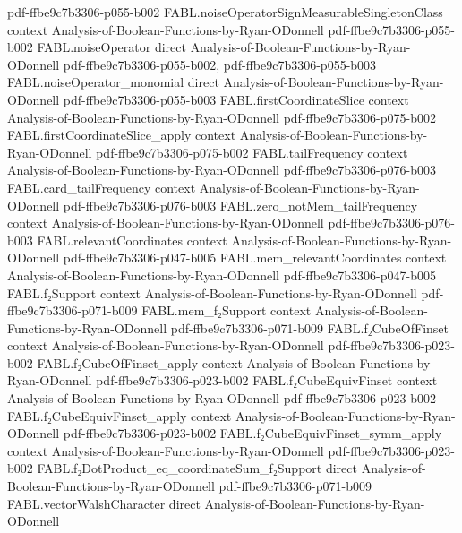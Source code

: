 \begin{theorem}
  {pdf-ffbe9c7b3306-p055-b002}
\proofstep
  {FABL.noiseOperatorSignMeasurableSingletonClass}
  {context}
  {Analysis-of-Boolean-Functions-by-Ryan-ODonnell}
  {pdf-ffbe9c7b3306-p055-b002}
\proofstep
  {FABL.noiseOperator}
  {direct}
  {Analysis-of-Boolean-Functions-by-Ryan-ODonnell}
  {pdf-ffbe9c7b3306-p055-b002,
    pdf-ffbe9c7b3306-p055-b003}
\proofstep
  {FABL.noiseOperator_monomial}
  {direct}
  {Analysis-of-Boolean-Functions-by-Ryan-ODonnell}
  {pdf-ffbe9c7b3306-p055-b003}
\proofstep
  {FABL.firstCoordinateSlice}
  {context}
  {Analysis-of-Boolean-Functions-by-Ryan-ODonnell}
  {pdf-ffbe9c7b3306-p075-b002}
\proofstep
  {FABL.firstCoordinateSlice_apply}
  {context}
  {Analysis-of-Boolean-Functions-by-Ryan-ODonnell}
  {pdf-ffbe9c7b3306-p075-b002}
\proofstep
  {FABL.tailFrequency}
  {context}
  {Analysis-of-Boolean-Functions-by-Ryan-ODonnell}
  {pdf-ffbe9c7b3306-p076-b003}
\proofstep
  {FABL.card_tailFrequency}
  {context}
  {Analysis-of-Boolean-Functions-by-Ryan-ODonnell}
  {pdf-ffbe9c7b3306-p076-b003}
\proofstep
  {FABL.zero_notMem_tailFrequency}
  {context}
  {Analysis-of-Boolean-Functions-by-Ryan-ODonnell}
  {pdf-ffbe9c7b3306-p076-b003}
\proofstep
  {FABL.relevantCoordinates}
  {context}
  {Analysis-of-Boolean-Functions-by-Ryan-ODonnell}
  {pdf-ffbe9c7b3306-p047-b005}
\proofstep
  {FABL.mem_relevantCoordinates}
  {context}
  {Analysis-of-Boolean-Functions-by-Ryan-ODonnell}
  {pdf-ffbe9c7b3306-p047-b005}
\proofstep
  {FABL.f₂Support}
  {context}
  {Analysis-of-Boolean-Functions-by-Ryan-ODonnell}
  {pdf-ffbe9c7b3306-p071-b009}
\proofstep
  {FABL.mem_f₂Support}
  {context}
  {Analysis-of-Boolean-Functions-by-Ryan-ODonnell}
  {pdf-ffbe9c7b3306-p071-b009}
\proofstep
  {FABL.f₂CubeOfFinset}
  {context}
  {Analysis-of-Boolean-Functions-by-Ryan-ODonnell}
  {pdf-ffbe9c7b3306-p023-b002}
\proofstep
  {FABL.f₂CubeOfFinset_apply}
  {context}
  {Analysis-of-Boolean-Functions-by-Ryan-ODonnell}
  {pdf-ffbe9c7b3306-p023-b002}
\proofstep
  {FABL.f₂CubeEquivFinset}
  {context}
  {Analysis-of-Boolean-Functions-by-Ryan-ODonnell}
  {pdf-ffbe9c7b3306-p023-b002}
\proofstep
  {FABL.f₂CubeEquivFinset_apply}
  {context}
  {Analysis-of-Boolean-Functions-by-Ryan-ODonnell}
  {pdf-ffbe9c7b3306-p023-b002}
\proofstep
  {FABL.f₂CubeEquivFinset_symm_apply}
  {context}
  {Analysis-of-Boolean-Functions-by-Ryan-ODonnell}
  {pdf-ffbe9c7b3306-p023-b002}
\proofstep
  {FABL.f₂DotProduct_eq_coordinateSum_f₂Support}
  {direct}
  {Analysis-of-Boolean-Functions-by-Ryan-ODonnell}
  {pdf-ffbe9c7b3306-p071-b009}
\proofstep
  {FABL.vectorWalshCharacter}
  {direct}
  {Analysis-of-Boolean-Functions-by-Ryan-ODonnell}

\end{theorem}
